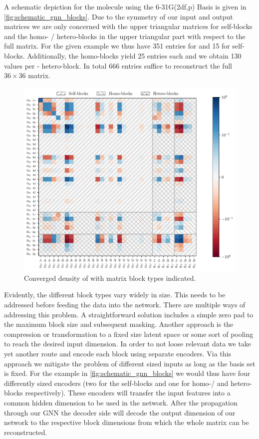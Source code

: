 A schematic depiction for the  molecule using the 6-31G(2df,p) Basis is given in \autoref{fig:schematic_gnn_blocks}. Due to the symmetry of our input and output matrices we are only concerned with the upper triangular matrices for self-blocks and the homo- / hetero-blocks in the upper triangular part with respect to the full matrix. For the given example we thus have 351 entries for  and 15 for  self-blocks. Additionally, the  homo-blocks yield 25 entries each and we obtain 130 values per - hetero-block. In total 666 entries suffice to reconstruct the full $36 \times 36$ matrix. 
\begin{figure}[H]
    \centering
    \includegraphics[width=\textwidth]{../fig/gnn/schematic_blocks.pdf}
    \caption[Matrix block regions of ]{Converged density of  with matrix block types indicated.}
    \label{fig:schematic_gnn_blocks}
\end{figure}
Evidently, the different block types vary widely in size. This needs to be addressed before feeding the data into the network. There are multiple ways of addressing this problem. A straightforward solution includes a simple zero pad to the maximum block size and subsequent masking.  Another approach is the compression or transformation to a fixed size latent space or some sort of pooling to reach the desired input dimension. In order to not loose relevant data we take yet another route and encode each block using separate encoders. Via this approach we mitigate the problem of different sized inputs as long as the basis set is fixed. For the example in \autoref{fig:schematic_gnn_blocks} we would thus have four differently sized encoders (two for the self-blocks and one for homo-/ and hetero-blocks respectively). These encoders will transfer the input features into a common hidden dimension to be used in the network. After the propagation through our GNN the decoder side will decode the output dimension of our network to the respective block dimensions from which the whole matrix can be reconstructed.
